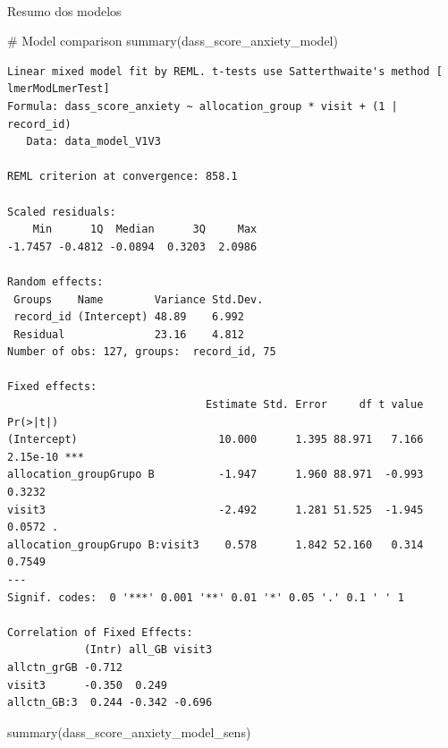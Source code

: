 \documentclass[
  letterpaper,
  DIV=11,
  numbers=noendperiod]{scrartcl}
\makeatletter
\let\oldparagraph\paragraph
\renewcommand{\paragraph}{
    \@ifstar
      \xxxParagraphStar
      \xxxParagraphNoStar
  }
\newcommand{\xxxParagraphStar}[1]{\oldparagraph*{#1}\mbox{}}
\newcommand{\xxxParagraphNoStar}[1]{\oldparagraph{#1}\mbox{}}
\newenvironment{Shaded}{\begin{snugshade}}{\end{snugshade}}
\newcommand{\CommentTok}[1]{\textcolor[rgb]{0.37,0.37,0.37}{#1}}
\newcommand{\FunctionTok}[1]{\textcolor[rgb]{0.28,0.35,0.67}{#1}}
\newcommand{\NormalTok}[1]{\textcolor[rgb]{0.00,0.23,0.31}{#1}}
\makeatother
\begin{document}
\paragraph{Resumo dos modelos}\label{resumo-dos-modelos-23}

\begin{Shaded}
\begin{Highlighting}[]
\CommentTok{\# Model comparison}
\FunctionTok{summary}\NormalTok{(dass\_score\_anxiety\_model)}
\end{Highlighting}
\end{Shaded}

\begin{verbatim}
Linear mixed model fit by REML. t-tests use Satterthwaite's method [
lmerModLmerTest]
Formula: dass_score_anxiety ~ allocation_group * visit + (1 | record_id)
   Data: data_model_V1V3

REML criterion at convergence: 858.1

Scaled residuals: 
    Min      1Q  Median      3Q     Max 
-1.7457 -0.4812 -0.0894  0.3203  2.0986 

Random effects:
 Groups    Name        Variance Std.Dev.
 record_id (Intercept) 48.89    6.992   
 Residual              23.16    4.812   
Number of obs: 127, groups:  record_id, 75

Fixed effects:
                               Estimate Std. Error     df t value Pr(>|t|)    
(Intercept)                      10.000      1.395 88.971   7.166 2.15e-10 ***
allocation_groupGrupo B          -1.947      1.960 88.971  -0.993   0.3232    
visit3                           -2.492      1.281 51.525  -1.945   0.0572 .  
allocation_groupGrupo B:visit3    0.578      1.842 52.160   0.314   0.7549    
---
Signif. codes:  0 '***' 0.001 '**' 0.01 '*' 0.05 '.' 0.1 ' ' 1

Correlation of Fixed Effects:
            (Intr) all_GB visit3
allctn_grGB -0.712              
visit3      -0.350  0.249       
allctn_GB:3  0.244 -0.342 -0.696
\end{verbatim}

\begin{Shaded}
\begin{Highlighting}[]
\FunctionTok{summary}\NormalTok{(dass\_score\_anxiety\_model\_sens)}
\end{Highlighting}
\end{Shaded}
\end{document}
